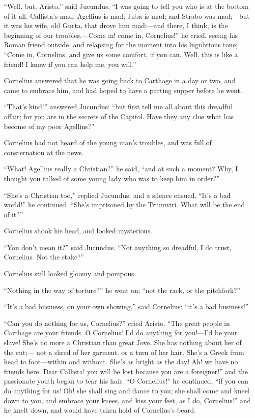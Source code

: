 ``Well, but, Aristo,'' said Jucundus, ``I was going to
tell you who is at the bottom of it all. Callista's mad; Agellius is
mad; Juba is mad; and Strabo was mad;—but it was his wife, old Gurta,
that drove him mad;—and there, I think, is the beginning of our
troubles.—Come in! come in, Cornelius!'' he cried, seeing
his Roman friend outside, and relapsing for the moment into his
lugubrious tone; ``Come in, Cornelius, and give us some comfort,
if you can. Well, this is like a friend! I know if you can help me,
you will.''

Cornelius answered that he was going back to Carthage in a day or
two, and came to embrace him, and had hoped to have a parting supper
before he went.

``That's kind!'' answered Jucundus: ``but first tell me
all about this dreadful affair; for you are in the secrets of the
Capitol. Have they any clue what has become of my poor Agellius?''

Cornelius had not heard of the young man's troubles, and was full
of consternation at the news.

``What! Agellius really a Christian?'' he said, ``and
at such a moment? Why, I thought you talked of some young lady who was
to keep him in order?''

``She's a Christian too,'' replied Jucundus; and a silence
ensued. ``It's a bad world!'' he continued. ``She's
imprisoned by the Triumviri. What will be the end of it?''

Cornelius shook his head, and looked mysterious.

``You don't mean it?'' said Jucundus. ``Not anything so
dreadful, I do trust, Cornelius. Not the stake?''

Cornelius still looked gloomy and pompous.

``Nothing in the way of torture?'' he went on; ``not
the rack, or the pitchfork?''

``It's a bad business, on your own showing,'' said
Cornelius: ``it's a bad business!''

``Can you do nothing for us, Cornelius?'' cried Aristo.
``The great people in Carthage are your friends. O Cornelius! I'd
do anything for you!—I'd be your slave! She's no more a Christian
than great Jove. She has nothing about her of the cut;— not a shred
of her garment, or a turn of her hair. She's a Greek from head to foot—within
and without. She's as bright as the day! Ah! we have no friends here.
Dear Callista! you will be lost because you are a foreigner!'' and
the passionate youth began to tear his hair. ``O Cornelius!''
he continued, ``if you can do anything for us! Oh! she shall sing
and dance to you; she shall come and kneel down to you, and embrace
your knees, and kiss your feet, as I do, Cornelius!'' and he knelt
down, and would have taken hold of Cornelius's beard.

